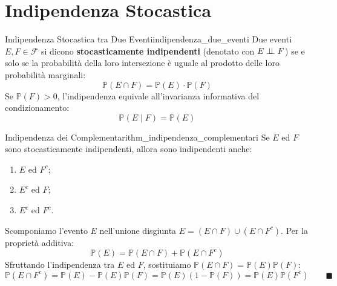 \section{Indipendenza Stocastica}
\label{sec:indipendenza_stocastica}

\begin{definizione}{Indipendenza Stocastica tra Due Eventi}{indipendenza_due_eventi}
Due eventi $E, F \in \mathcal{F}$ si dicono \textbf{stocasticamente indipendenti} (denotato con $E \perp\!\!\!\perp F$) se e solo se la probabilità della loro intersezione è uguale al prodotto delle loro probabilità marginali:
\begin{equation}
    \mathbb{P}(E \cap F) = \mathbb{P}(E) \cdot \mathbb{P}(F)
\end{equation}
Se $\mathbb{P}(F) > 0$, l'indipendenza equivale all'invarianza informativa del condizionamento:
\begin{equation}
    \mathbb{P}(E \mid F) = \mathbb{P}(E)
\end{equation}
\end{definizione}

\begin{teorema}{Indipendenza dei Complementari}{thm_indipendenza_complementari}
Se $E$ ed $F$ sono stocasticamente indipendenti, allora sono indipendenti anche:
\begin{enumerate}
    \item $E$ ed $F^c$;
    \item $E^c$ ed $F$;
    \item $E^c$ ed $F^c$.
\end{enumerate}
\end{teorema}

\begin{dimostrazione}
Scomponiamo l'evento $E$ nell'unione disgiunta $E = (E \cap F) \cup (E \cap F^c)$. Per la proprietà additiva:
\begin{equation}
    \mathbb{P}(E) = \mathbb{P}(E \cap F) + \mathbb{P}(E \cap F^c)
\end{equation}
Sfruttando l'indipendenza tra $E$ ed $F$, sostituiamo $\mathbb{P}(E \cap F) = \mathbb{P}(E)\mathbb{P}(F)$:
\begin{equation}
    \mathbb{P}(E \cap F^c) = \mathbb{P}(E) - \mathbb{P}(E)\mathbb{P}(F) = \mathbb{P}(E)(1 - \mathbb{P}(F)) = \mathbb{P}(E)\mathbb{P}(F^c) \qquad \blacksquare
\end{equation}
\end{dimostrazione}

